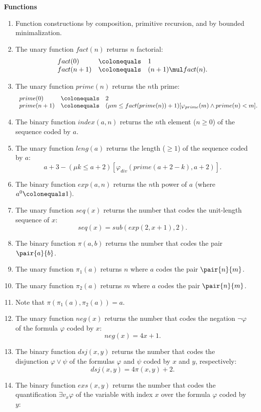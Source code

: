 \textbf{\Large Functions}
\begin{enumerate}[1.]
%
\item Function constructions by composition, primitive recursion, and by bounded minimalization.
%
\item The unary function $fact(n)$ returns $n$ factorial:
\[
\begin{array}{lll}
fact(0)     & \colonequals & 1 \cr
fact(n + 1) & \colonequals & (n + 1) \mul fact(n).
\end{array}
\]
%
\item The unary function $prime(n)$ returns the $n$th prime:
\[
\begin{array}{lll}
prime(0)     & \colonequals & 2 \cr
prime(n + 1) & \colonequals & (\mu m \leq fact(prime(n)) + 1)[\varphi_{prime}(m) \land prime(n) < m].
\end{array}
\]
%
\item The binary function $index(a, n)$ returns the $n$th element ($n \geq 0$) of the sequence coded by $a$.
%
\item The unary function $leng(a)$ returns the length ($\geq 1$) of the sequence coded by $a$:
\[
a + 3 - (\mu k \leq a + 2)[\varphi_{div}(prime(a + 2 - k), a + 2)].
\]
%
\item The binary function $exp(a, n)$ returns the $n$th power of $a$ (where $a^0 \colonequals 1$).
%
\item The unary function $seq(x)$ returns the number that codes the unit-length sequence of $x$:
\[
seq(x) = sub(exp(2, x + 1), 2).
\]
%
\item The binary function $\pi(a, b)$ returns the number that codes the pair $\pair{a}{b}$.
%
\item The unary function $\pi_1(a)$ returns $n$ where $a$ codes the pair $\pair{n}{m}$.
%
\item The unary function $\pi_2(a)$ returns $m$ where $a$ codes the pair $\pair{n}{m}$.
%
\item Note that $\pi(\pi_1(a), \pi_2(a)) = a$.
%
\item The unary function $neg(x)$ returns the number that codes the negation $\neg\varphi$ of the formula $\varphi$ coded by $x$:
\[
neg(x) = 4x + 1.
\]
%
\item The binary function $dsj(x, y)$ returns the number that codes the disjunction $\varphi \lor \psi$ of the formulas $\varphi$ and $\psi$ coded by $x$ and $y$, respectively:
\[
dsj(x, y) = 4\pi(x, y) + 2.
\]
%
\item The binary function $exs(x, y)$ returns the number that codes the quantification $\exists v_x \varphi$ of the variable with index $x$ over the formula $\varphi$ coded by $y$:

\end{enumerate}

